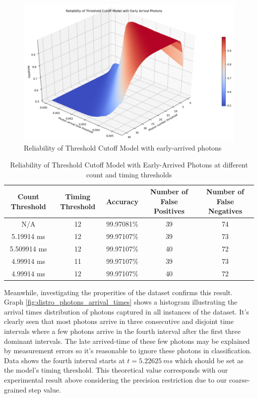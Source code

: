 \documentclass[letterpaper,twocolumn,10pt]{article}
\begin{document}
\begin{figure}
    \includegraphics[width=\linewidth]{Figures/threshold_cutoff_early_arrival_accuracy.png}
    \centering
    \caption{Reliability of Threshold Cutoff Model with early-arrived photons}
    \label{fig:threshold_cutoff_early_arrival}
\end{figure}

\begin{table}
    \caption{Reliability of Threshold Cutoff Model with Early-Arrived Photons at different count and timing thresholds}
    \begin{center}
        \begin{tabular}{c c c c c}
            Count Threshold & Timing Threshold & Accuracy & Number of False Positives & Number of False Negatives \\ [0.5ex] 
            \hline
            N/A	& 12 & 99.97081\% & 39 & 74 \\
            5.19914	ms & 12 & 99.97107\% & 39 & 73 \\ 
            5.509914 ms & 12 & 99.97107\% & 40 & 72 \\
            4.99914 ms & 11 & 99.97107\% & 39 & 73 \\
            4.99914 ms & 12 & 99.97107\% & 40 & 72 \\
       \end{tabular}
    \end{center}
    \label{table:threshold_cutoff_early_arrival}  
\end{table}

Meanwhile, investigating the properities of the dataset confirms this result. Graph \ref{fig:distro_photons_arrival_times} shows a histogram illustrating the arrival times distribution of photons captured in all instances of the dataset. It's clearly seen that most photons arrive in three consecutive and disjoint time intervals where a few photons arrive in the fourth interval after the first three dominant intervals. The late arrived-time of these few photons may be explained by measurement errors so it's reasonable to ignore these photons in classification. Data shows the fourth interval starts at $t = 5.22625 \ ms$ which should be set as the model's timing threshold. This theoretical value corresponds with our experimental result above considering the precision restriction due to our coarse-grained step value.
\end{document}
